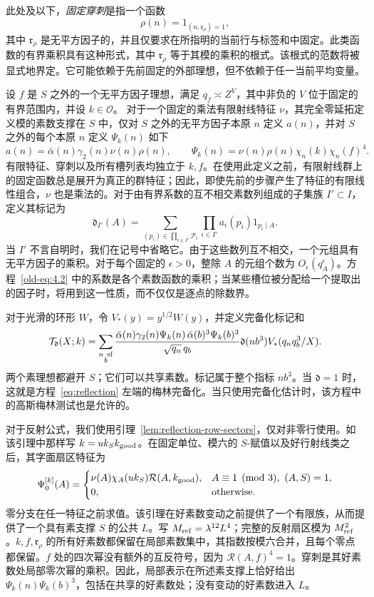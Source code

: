 \documentclass[11pt,a4paper]{article}
\numberwithin{equation}{section}
\numberwithin{figure}{section}
\theoremstyle{definition}
\theoremstyle{remark}
\begin{document}
此处及以下，\emph{固定穿刺}是指一个函数
\[
 \rho(n)=1_{(n,\mathfrak r_\rho)=1},
\]
其中 \(\mathfrak r_\rho\) 是无平方因子的，并且仅要求在所指明的当前行与标签和中固定。此类函数的有界乘积具有这种形式，其中 \(\mathfrak r_\rho\) 等于其模的乘积的根式。该根式的范数将被显式地界定。它可能依赖于先前固定的外部理想，但不依赖于任一当前平均变量。

设 \(f\) 是 \(S\) 之外的一个无平方因子理想，满足
\(q_f\asymp Z^V\)，其中非负的 \(V\) 位于固定的有界范围内，并设 \(k\in\mathcal O\)。
对于一个固定的乘法有限射线特征 \(\nu\)，其完全零延拓定义模的素数支撑在 \(S\) 中，仅对 \(S\) 之外的无平方因子本原 \(n\) 定义 \(a(n)\)，并对 \(S\) 之外的每个本原 \(n\) 定义 \(\Psi_k(n)\) 如下
\[
 a(n)=\bar\alpha(n)\gamma_2(n)\nu(n)\rho(n),\qquad
 \Psi_k(n)=\nu(n)\rho(n)\chi_n(k)\chi_n(f)^4.
\]
有限特征、穿刺以及所有槽列表均独立于
\(k,f\)。在使用此定义之前，有限射线群上的固定函数总是展开为真正的群特征；因此，即使先前的步骤产生了特征的有限线性组合，\(\nu\) 也是乘法的。对于由有界系数的互不相交素数列组成的子集族 \(I'\subset I\)，定义其标记为
\begin{equation}\label{old-eq:4.2}
 \mathfrak d_{I'}(A)=
 \sum_{(p_i)\in\prod_{i\in I'}\mathcal P_i}
      \prod_{i\in I'}a_i(p_i)1_{p_i\mid A}.
\end{equation}
当 \(I'\) 不言自明时，我们在记号中省略它。由于这些数列互不相交，一个元组具有无平方因子的乘积。对于每个固定的 \(\epsilon>0\)，整除 \(A\) 的元组个数为 \(O_\epsilon(q_A^\epsilon)\)。方程~\eqref{old-eq:4.2} 中的系数是各个素数函数的乘积；当某些槽位被分配给一个提取出的因子时，将用到这一性质，而不仅仅是逐点的除数界。

对于光滑的环形 \(W\)，令 \(V_*(y)=y^{1/2}W(y)\)，并定义完备化标记和
\begin{equation}\label{eq:marked-completion}
 \mathcal T_{\mathfrak d}(X;k)=
 \sum_{\substack{n\ {\rm sf}\\b}}
 \frac{\bar\alpha(n)\gamma_2(n)\Psi_k(n)\,
       \bar\alpha(b)^3\Psi_k(b)^3}{\sqrt{q_n}\,q_b}
 \mathfrak d(nb^3)V_*(q_nq_b^3/X).
\end{equation}
两个素理想都避开 \(S\)；它们可以共享素数。标记属于整个指标 \(nb^3\)。当 \(\mathfrak d=1\) 时，这就是方程~\eqref{eq:reflection} 左端的梅林完备化。当只使用完备化估计时，该方程中的高斯梅林测试也是允许的。

对于反射公式，我们使用引理~\ref{lem:reflection-row-sectors}，仅对非零行使用。如该引理中那样写 \(k=u k_S k_{\rm good}\)。在固定单位、模六的 \(S\)-赋值以及好行射线类之后，其字面扇区特征为
\[
 \Psi_0^{[k]}(A)=
 \begin{cases}
 \nu(A)\chi_A(u k_S)\mathcal R(A,k_{\rm good}),
       &A\equiv1\pmod3,\ (A,S)=1,\\
 0,&\text{otherwise}.
 \end{cases}
\]
零分支在任一特征之前求值。该引理在好素数变动之前提供了一个有限族，从而提供了一个具有素支撑 \(S\) 的公共 \(L\)。写 \(M_{\rm ref}=\lambda^{12}L^4\)；完整的反射扇区模为 \(M_{\rm ref}^2\)。\(k,f,\mathfrak r_\rho\) 的所有好素数都保留在局部素数集中，其指数按模六合并，且每个零点都保留。\(f\) 处的四次幂没有额外的互反符号，因为 \(\mathcal R(A,f)^4=1\)。穿刺是其好素数处局部零次幂的乘积。因此，局部表示在所述素支撑上恰好给出 \(\Psi_k(n)\Psi_k(b)^3\)，包括在共享的好素数处；没有变动的好素数进入 \(L\)。
\end{document}
